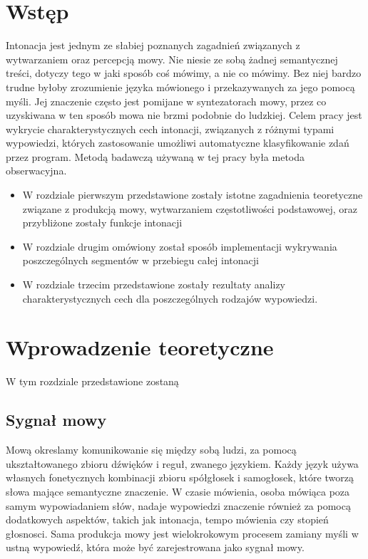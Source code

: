\documentclass[a4paper,12 pt]{article}
\begin{document}
\section*{Wstęp}
Intonacja jest jednym ze słabiej poznanych zagadnień związanych z wytwarzaniem oraz percepcją mowy. Nie niesie ze sobą żadnej semantycznej treści, dotyczy tego w jaki sposób coś mówimy, a nie co mówimy. Bez niej bardzo trudne byłoby zrozumienie języka mówionego i przekazywanych za jego pomocą myśli. Jej znaczenie często jest pomijane w syntezatorach mowy, przez co uzyskiwana w ten sposób mowa nie brzmi podobnie do ludzkiej.
\newline
\newline
Celem pracy jest wykrycie charakterystycznych cech intonacji, związanych z różnymi typami wypowiedzi, których zastosowanie umożliwi automatyczne klasyfikowanie zdań przez program. Metodą badawczą używaną w tej pracy była metoda obserwacyjna.
\begin{itemize}
\item{W rozdziale pierwszym przedstawione zostały istotne zagadnienia teoretyczne związane z produkcją mowy, wytwarzaniem częstotliwości podstawowej,
oraz przybliżone zostały funkcje intonacji}
\item{W rozdziale drugim omówiony został sposób implementacji wykrywania poszczególnych segmentów w przebiegu całej intonacji}
\item{W rozdziale trzecim przedstawione zostały rezultaty analizy charakterystycznych cech dla poszczególnych rodzajów wypowiedzi.}
\end{itemize}
\newpage
\section{Wprowadzenie teoretyczne}
W tym rozdziale przedstawione zostaną
\subsection{Sygnał mowy}
Mową okreslamy komunikowanie się między sobą ludzi, za pomocą ukształtowanego zbioru dźwięków i reguł, zwanego językiem. Każdy język używa własnych fonetycznych kombinacji zbioru spółgłosek i samogłosek, które tworzą słowa mające semantyczne znaczenie. W czasie mówienia, osoba mówiąca poza samym wypowiadaniem słów, nadaje wypowiedzi znaczenie również za pomocą dodatkowych aspektów, takich jak intonacja, tempo mówienia czy stopień głosnosci.
Sama produkcja mowy jest wielokrokowym procesem zamiany myśli w ustną wypowiedź, która może być zarejestrowana jako sygnał mowy.
\end{document}
